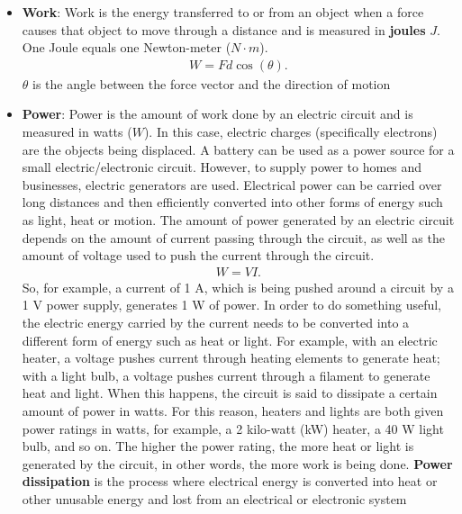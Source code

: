 \documentclass{report}
\begin{document}
\begin{itemize}
\begin{itemize}
            \end{itemize}
        \item \textbf{Work}: Work is the energy transferred to or from an object when a force causes that object to move through a distance and is measured in \textbf{joules} $J$. One Joule equals one Newton-meter ($N \cdot m$).
            \begin{align*}
                W = Fd\cos{\left(\theta \right)}
            .\end{align*}
            $\theta $ is the angle between the force vector and the direction of motion
        \item \textbf{Power}: Power is the amount of work done by an electric circuit and is measured in watts ($W$).
            \bigbreak \noindent 
            In this case, electric charges (specifically electrons) are the objects being displaced. A battery can be used as a power source for a small electric/electronic circuit. However, to supply power to homes and businesses, electric generators are used. Electrical power can be carried over long distances and then efficiently converted into other forms of energy such as light, heat or motion.
            \bigbreak \noindent 
            The amount of power generated by an electric circuit depends on the amount of current passing through the circuit, as well as the amount of voltage used to push the current through the circuit.
            \bigbreak \noindent 
            \begin{align*}
                W = VI
            .\end{align*}
            So, for example, a current of 1 A, which is being pushed around a circuit by a 1 V power supply, generates 1 W of power.
            \bigbreak \noindent 
            In order to do something useful, the electric energy carried by the current needs to be converted into a different form of energy such as heat or light. For example, with an electric heater, a voltage pushes current through heating elements to generate heat; with a light bulb, a voltage pushes current through a filament to generate heat and light. When this happens, the circuit is said to dissipate a certain amount of power in watts. For this reason, heaters and lights are both given power ratings in watts, for example, a 2 kilo-watt (kW) heater, a 40 W light bulb, and so on. The higher the power rating, the more heat or light is generated by the circuit, in other words, the more work is being done.
            \bigbreak \noindent 
            \textbf{Power dissipation} is the process where electrical energy is converted into heat or other unusable energy and lost from an electrical or electronic system

\end{itemize}
\end{document}
